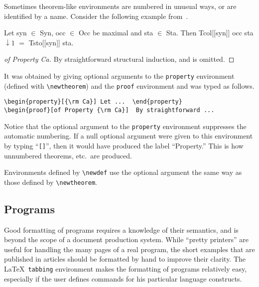 Sometimes theorem-like environments are numbered in unusual ways, or
are identified by a name.  Consider the following example
from~.
\begin{property}[{\rm Ca}]
Let syn $\in$ Syn, occ $\in$ Occ be maximal and sta $\in$ Sta.  Then
Tcol\/{\rm [[}syn\/{\rm ]]} occ sta\hspace{-2pt} $\downarrow\!1$ $=$
Tsto\/{\rm [[}syn\/{\rm ]]} sta.
\end{property}
\begin{proof}[of Property {\rm Ca}]
By straightforward structural induction, and is \linebreak
omitted.
\end{proof}
It was obtained by giving optional arguments to the
{\tt property} environment (defined with \verb|\newtheorem|)
and the {\tt proof} environment and was typed as follows.
\begin{verbatim}
\begin{property}[{\rm Ca}] Let ...  \end{property}
\begin{proof}[of Property {\rm Ca}]  By straightforward ...
\end{verbatim}
Notice that the optional argument to the {\tt property} environment
suppresses the automatic numbering.  If a null optional argument
were given to this environment by typing ``{\tt []}'', then
it would have produced the label ``{\sc Property.}''  This is
how unnumbered theorems, etc.\ are produced.

Environments defined by \verb|\newdef| use the optional
argument the same way as those defined by \verb|\newtheorem|.

\subsection{Programs}

Good formatting of programs requires a knowledge of their semantics,
and is beyond the scope of a document production system.  While
``pretty printers'' are useful for handling the many pages of a real
program, the short examples that are published in articles should be
formatted by hand to improve their clarity.  The \LaTeX\ {\tt tabbing}
environment makes the formatting of programs relatively easy,
especially if the user defines commands for his particular language
constructs.

